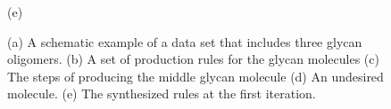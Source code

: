 \begin{figure}[ht!]
\begin{minipage}{0.75\linewidth}
    (e)
  \end{minipage}


  
  \vspace{-3mm}
  \caption{(a) A schematic example of a data set that includes three glycan oligomers.
    (b) A set of production rules for the glycan molecules
    (c) The steps of producing the middle glycan molecule
    (d) An undesired molecule.
    (e) The synthesized rules at the first iteration.
  }
  
  \label{fig:ex-gly}
  \vspace{6mm}
\end{figure}

